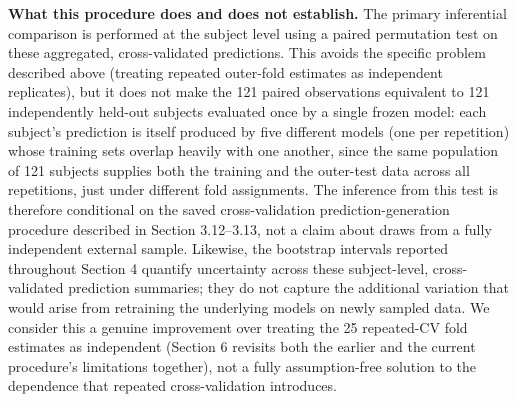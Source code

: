 \documentclass[a4paper,fleqn]{cas-sc}
\begin{document}
\textbf{What this procedure does and does not establish.} The primary inferential comparison is performed at the subject level using a paired permutation test on these aggregated, cross-validated predictions. This avoids the specific problem described above (treating repeated outer-fold estimates as independent replicates), but it does not make the 121 paired observations equivalent to 121 independently held-out subjects evaluated once by a single frozen model: each subject's prediction is itself produced by five different models (one per repetition) whose training sets overlap heavily with one another, since the same population of 121 subjects supplies both the training and the outer-test data across all repetitions, just under different fold assignments. The inference from this test is therefore conditional on the saved cross-validation prediction-generation procedure described in Section 3.12--3.13, not a claim about draws from a fully independent external sample. Likewise, the bootstrap intervals reported throughout Section 4 quantify uncertainty across these subject-level, cross-validated prediction summaries; they do not capture the additional variation that would arise from retraining the underlying models on newly sampled data. We consider this a genuine improvement over treating the 25 repeated-CV fold estimates as independent (Section 6 revisits both the earlier and the current procedure's limitations together), not a fully assumption-free solution to the dependence that repeated cross-validation introduces.
\end{document}
